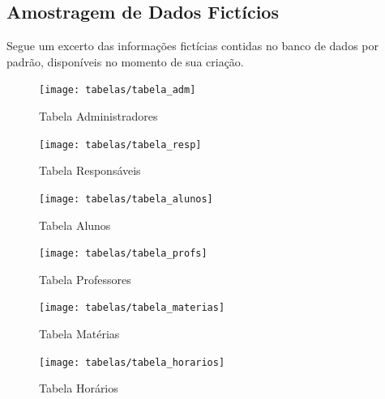 \documentclass[main.tex]{subfiles}
\begin{document}
\subsection{Amostragem de Dados Fictícios}
Segue um excerto das informações fictícias contidas no banco de dados por padrão, disponíveis no momento de sua criação.

\begin{figure}[H]
    \centering
    \texttt{[image: tabelas/tabela\_adm]}
    \caption{Tabela Administradores}
\end{figure}
\begin{figure}[H]
    \centering
    \texttt{[image: tabelas/tabela\_resp]}
    \caption{Tabela Responsáveis}
\end{figure}
\begin{figure}[H]
    \centering
    \texttt{[image: tabelas/tabela\_alunos]}
    \caption{Tabela Alunos}
\end{figure}
\begin{figure}[H]
    \centering
    \texttt{[image: tabelas/tabela\_profs]}
    \caption{Tabela Professores}
\end{figure}
\begin{figure}[H]
    \centering
    \texttt{[image: tabelas/tabela\_materias]}
    \caption{Tabela Matérias}
\end{figure}
\begin{figure}[H]
    \centering
    \texttt{[image: tabelas/tabela\_horarios]}
    \caption{Tabela Horários}
\end{figure}


\end{document}
